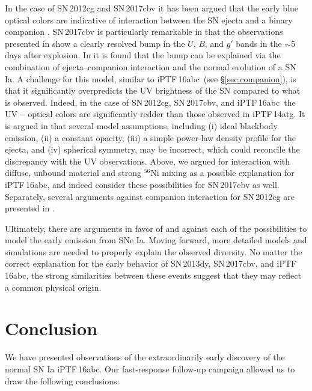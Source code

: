 \documentclass[twocolumn]{aastex61}
\newcommand{\abc}{iPTF\,16abc}
\begin{document}
In the case of SN\,2012cg and SN\,2017cbv it has been argued that the early
blue optical colors are indicative of interaction between the SN ejecta and
a binary companion \citep{2016ApJ...820...92M,2017ApJ...845L..11H}.
SN\,2017cbv is particularly remarkable in that the observations presented in
\citet{2017ApJ...845L..11H} show a clearly resolved bump in the $U$, $B$,
and $g'$ bands in the $\sim$5\,days after explosion. In
\citeauthor{2017ApJ...845L..11H} it is found that the bump can be explained
via the combination of ejecta--companion interaction and the normal
evolution of a SN Ia. A challenge for this model, similar to \abc\ (see
\S\ref{sec:companion}), is that it significantly overpredicts the UV
brightness of the SN compared to what is observed. Indeed, in the case of
SN\,2012cg, SN\,2017cbv, and \abc\ the $\mathrm{UV} - \mathrm{optical}$
colors are significantly redder than those observed in iPTF\,14atg. It is
argued in \citet{2017ApJ...845L..11H} that several model assumptions,
including (i) ideal blackbody emission, (ii) a constant opacity, (iii) a
simple power-law density profile for the ejecta, and (iv) spherical
symmetry, may be incorrect, which could reconcile the discrepancy with the
UV observations. Above, we argued for interaction with diffuse, unbound
material and strong $^{56}$Ni mixing as a possible explanation for \abc, and
indeed \citet{2017ApJ...845L..11H} consider these possibilities for
SN\,2017cbv as well. Separately, several arguments against companion
interaction for SN\,2012cg are presented in \citet{2016arXiv161007601S}.

Ultimately, there are arguments in favor of and against each of the
possibilities to model the early emission from SNe Ia. Moving forward, more
detailed models and simulations are needed to properly explain the observed
diversity. No matter the correct explanation for the early behavior of
SN\,2013dy, SN\,2017cbv, and \abc, the strong similarities between these
events suggest that they may reflect a common physical origin.

\section{Conclusion}
\label{sec:conclusion}

We have presented observations of the extraordinarily early discovery of the 
normal SN Ia \abc. Our fast-response follow-up 
campaign allowed us to draw the following conclusions:
\end{document}
